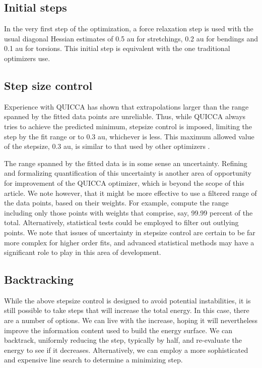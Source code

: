 \documentclass[prl,twocolumn,showpacs,twocolumngrid,superbib]{revtex4}
\begin{document}
\subsection{Initial steps}

In the very first step of the optimization, a force relaxation step is used with the usual 
diagonal Hessian estimates of 0.5 au for stretchings, 0.2 au for bendings and 0.1 au for 
torsions.  This initial step is equivalent with the one traditional optimizers use.

\subsection{Step size control} \label{stepsizectrl}

Experience with QUICCA has shown that extrapolations larger 
than the range spanned by the fitted data points are unreliable.   Thus, 
while QUICCA  always tries to achieve the predicted minimum, 
stepsize control is imposed, limiting the step  by  the fit range or to 
0.3 au, whichever is less.   This maximum allowed value of the stepsize, 0.3 au, 
is similar to that used by other optimizers \cite{FEckert97}.  

The range spanned by the fitted data is in some sense an uncertainty.  
Refining and formalizing quantification of this uncertainty is another area of 
opportunity for improvement of the QUICCA optimizer, which is beyond the 
scope of this article.  We note however, that it might be more effective
to use a filtered range of the data points, based on their weights. 
For example, compute the range including only those points with weights that 
comprise, say,  99.99 percent of the total.   Alternatively, statistical 
tests could be employed to filter out outlying points.  We note that issues of
uncertainty in stepsize control are certain to be far more complex for higher 
order fits, and advanced statistical methods may have a significant role 
to play in this area of development.

\subsection{Backtracking}

While the above stepsize control is designed to avoid potential instabilities,
it is still possible to take steps that will increase the total energy.  In 
this case, there are a number of options.  We can live with the increase, 
hoping it will nevertheless improve the information content used to build the energy 
surface.  We can backtrack, uniformly reducing the step, typically by half, and re-evaluate
the energy to see if it decreases.   Alternatively, we can employ a more 
sophisticated and expensive line search to determine a minimizing step.  
\end{document}
